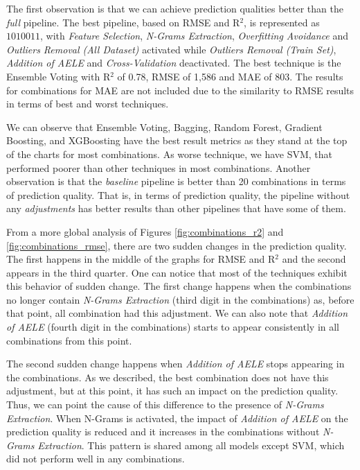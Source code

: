 The first observation is that we can achieve prediction qualities better than the \textit{full} pipeline. The best pipeline, based on \gls{RMSE} and R$^2$, is represented as $1010011$, with \textit{Feature Selection}, \textit{N-Grams Extraction}, \textit{Overfitting Avoidance} and \textit{Outliers Removal (All Dataset)} activated while \textit{Outliers Removal (Train Set)}, \textit{Addition of \gls{AELE}} and \textit{Cross-Validation} deactivated. The best technique is the Ensemble Voting with R$^2$ of 0.78, \gls{RMSE} of 1,586 and \gls{MAE} of 803. The results for combinations for \gls{MAE} are not included due to the similarity to \gls{RMSE} results in terms of best and worst techniques.

We can observe that Ensemble Voting, Bagging, Random Forest, Gradient Boosting, and XGBoosting have the best result metrics as they stand at the top of the charts for most combinations. As worse technique, we have SVM, that performed poorer than other techniques in most combinations. Another observation is that the \textit{baseline} pipeline is better than 20 combinations in terms of prediction quality. That is, in terms of prediction quality, the pipeline without any \textit{adjustments} has better results than other pipelines that have some of them.

From a more global analysis of Figures \ref{fig:combinations_r2} and \ref{fig:combinations_rmse}, there are two sudden changes in the prediction quality. The first happens in the middle of the graphs for \gls{RMSE} and R$^2$ and the second appears in the third quarter. One can notice that most of the techniques exhibit this behavior of sudden change. The first change happens when the combinations no longer contain \textit{N-Grams Extraction} (third digit in the combinations) as, before that point, all combination had this adjustment. We can also note that \textit{Addition of \gls{AELE}} (fourth digit in the combinations) starts to appear consistently in all combinations from this point. 

The second sudden change happens when \textit{Addition of \gls{AELE}} stops appearing in the combinations. As we described, the best combination does not have this adjustment, but at this point, it has such an impact on the prediction quality. Thus, we can point the cause of this difference to the presence of \textit{N-Grams Extraction}. When N-Grams is activated, the impact of \textit{Addition of \gls{AELE}} on the prediction quality is reduced and it increases in the combinations without \textit{N-Grams Extraction}. This pattern is shared among all models except \gls{SVM}, which did not perform well in any combinations.


